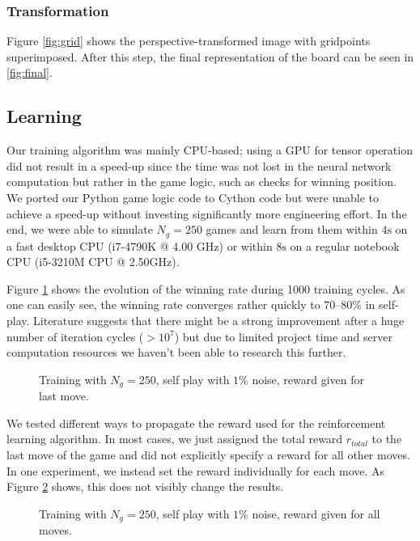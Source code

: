 \documentclass[10pt,twocolumn,letterpaper]{article}
\begin{document}
\subsubsection{Transformation}
Figure \ref{fig:grid} shows the perspective-transformed image with gridpoints superimposed.
After this step, the final representation of the board can be seen in \ref{fig:final}.



\subsection{Learning}
Our training algorithm was mainly CPU-based; using a GPU for tensor
operation did not result in a speed-up since the time was not lost in the neural
network computation but rather in the game logic, such as checks for winning position.
We ported our Python game logic code to Cython code but were
unable to achieve a speed-up without investing significantly more engineering effort.
In the end, we were able to simulate $N_g = 250$ games and learn from
them within $4\mathrm{s}$ on a fast desktop CPU (i7-4790K @ 4.00 GHz)
or within $8 \mathrm{s}$ on a regular notebook CPU (i5-3210M CPU @ 2.50GHz).

Figure \ref{fig:last_move_self_001} shows the evolution of the winning rate during
1000 training cycles.
As one can easily see, the winning rate converges rather quickly to $70–80 \%$ in self-play. Literature suggests that there might be a strong improvement after a huge number of iteration cycles ($> 10^7$) but due to limited project time and server computation resources we haven't been able to research this further.

\begin{figure}[t]
    \begin{center}
		\noindent
		\makebox[3.25in]{
	   		
		}
	\end{center}
    \caption{Training with $N_g=250$, self play with $1\%$ noise, reward given for last move.}
	\label{fig:last_move_self_001}
\end{figure}
We tested different ways to propagate the reward used for the reinforcement learning algorithm.
In most cases, we just assigned the total reward $r_{total}$ to the last move of the game and did not explicitly specify a reward for all other moves.
In one experiment, we instead set the reward individually for each move. %
As Figure \ref{fig:all_moves_self_001} shows, this does not visibly change the results.
\begin{figure}[t]
    \begin{center}
		\noindent
		\makebox[3.25in]{
	   		
		}
	\end{center}
    \caption{Training with $N_g=250$, self play with $1\%$ noise, reward given for all moves.}
	\label{fig:all_moves_self_001}
\end{figure}
\end{document}
